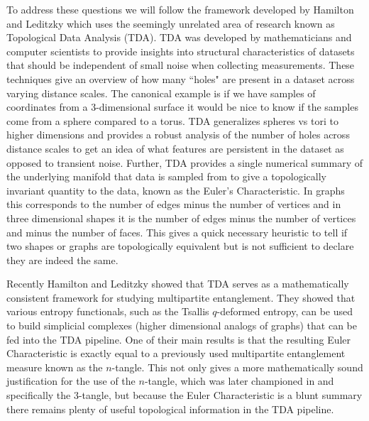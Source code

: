 \documentclass{article}
\begin{document}
To address these questions we will follow the framework developed by Hamilton and Leditzky \cite{hamilton2023probing} which uses the seemingly unrelated area of research known as Topological Data Analysis (TDA). TDA was developed by mathematicians and computer scientists to provide insights into structural characteristics of datasets that should be independent of small noise when collecting measurements. These techniques give an overview of how many ``holes" are present in a dataset across varying distance scales. The canonical example is if we have samples of coordinates from a 3-dimensional surface it would be nice to know if the samples come from a sphere compared to a torus. TDA generalizes spheres vs tori to higher dimensions and provides a robust analysis of the number of holes across distance scales to get an idea of what features are persistent in the dataset as opposed to transient noise. Further, TDA provides a single numerical summary of the underlying manifold that data is sampled from to give a topologically invariant quantity to the data, known as the Euler's Characteristic. In graphs this corresponds to the number of edges minus the number of vertices and in three dimensional shapes it is the number of edges minus the number of vertices and minus the number of faces. This gives a quick necessary heuristic to tell if two shapes or graphs are topologically equivalent but is not sufficient to declare they are indeed the same. 

Recently Hamilton and Leditzky \cite{hamilton2023probing} showed that TDA serves as a mathematically consistent framework for studying multipartite entanglement. They showed that various entropy functionals, such as the Tsallis $q$-deformed entropy, can be used to build simplicial complexes (higher dimensional analogs of graphs) that can be fed into the TDA pipeline. One of their main results is that the resulting Euler Characteristic is exactly equal to a previously used multipartite entanglement measure known as the $n$-tangle. This not only gives a more mathematically sound justification for the use of the $n$-tangle, which was later championed in \cite{horodecki2024multipartiteentanglement} and specifically the 3-tangle, but because the Euler Characteristic is a blunt summary there remains plenty of useful topological information in the TDA pipeline. 
\end{document}
